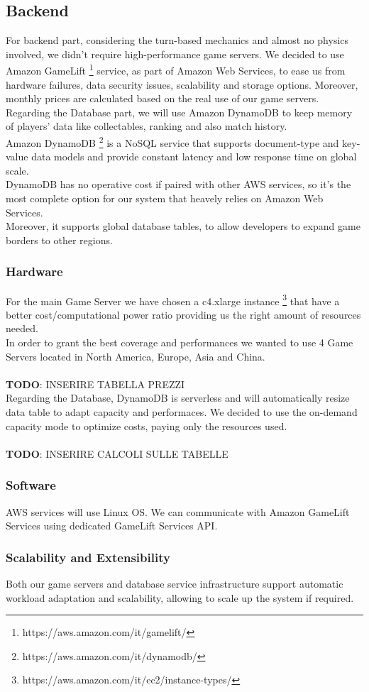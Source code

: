 \subsection{Backend}
For backend part, considering the turn-based mechanics and almost no physics involved, we didn't require high-performance game servers. We decided to use Amazon GameLift \footnote{https://aws.amazon.com/it/gamelift/} service, as part of Amazon Web Services, to ease us from hardware failures, data security issues, scalability and storage options. Moreover, monthly prices are calculated based on the real use of our game servers.\\
Regarding the Database part, we will use Amazon DynamoDB to keep memory of players’ data like collectables, ranking and also match history.\\
Amazon DynamoDB \footnote{https://aws.amazon.com/it/dynamodb/} is a NoSQL service that supports document-type and key-value data models and provide constant latency and low response time on global scale.\\
DynamoDB has no operative cost if paired with other AWS services, so it's the most complete option for our system that heavely relies on Amazon Web Services.\\
Moreover, it supports global database tables, to allow developers to expand game borders to other regions.
\subsubsection{Hardware}
For the main Game Server we have chosen a c4.xlarge instance \footnote{https://aws.amazon.com/it/ec2/instance-types/} that have a better cost/computational power ratio providing us the right amount of resources needed.\\
In order to grant the best coverage and performances we wanted to use 4 Game Servers located in North America, Europe, Asia and China.\\
\\
\textbf{TODO}: INSERIRE TABELLA PREZZI
\\
Regarding the Database, DynamoDB is serverless and will automatically resize data table to adapt capacity and performaces. We decided to use the on-demand capacity mode to optimize costs, paying only the resources used.\\
\\
\textbf{TODO}: INSERIRE CALCOLI SULLE TABELLE
\\
\subsubsection{Software}
AWS services will use Linux OS. We can communicate with Amazon GameLift Services using dedicated GameLift Services API.
\subsubsection{Scalability and Extensibility}
Both our game servers and database service infrastructure support automatic workload adaptation and scalability, allowing to scale up the system if required. \\